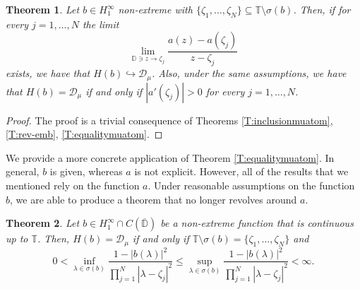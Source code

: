 \documentclass[12pt]{amsart}
\newtheorem{theorem}{Theorem}[section]
\theoremstyle{definition}
\theoremstyle{remark}
\theoremstyle{remark}
\begin{document}
\begin{theorem}
    Let $b\in H^\infty_1$ non-extreme with $\{\zeta_1,\ldots,\zeta_N\}\subseteq \mathbb{T}\setminus\sigma(b)$. Then, if for every $j=1,\ldots,N$ the limit
    \[\lim_{\mathbb{D}\ni z\to\zeta_j}\frac{a(z)-a(\zeta_j)}{z-\zeta_j}\]
    exists, we have that $H(b)\hookrightarrow\mathcal{D}_\mu$. Also, under the same assumptions, we have that  $H(b)=\mathcal{D}_\mu$ if and only if $|a'(\zeta_j)|>0$ for every $j=1,\ldots,N$.
\end{theorem}
\begin{proof}
    The proof is a trivial consequence of Theorems \ref{T:inclusionmuatom}, \ref{T:rev-emb}, \ref{T:equalitymuatom}.
\end{proof}
We provide a more concrete application of Theorem \ref{T:equalitymuatom}. In general, $b$ is given, whereas $a$ is not explicit. However, all of the results that we mentioned rely on the function $a$. Under reasonable assumptions on the function $b$, we are able to produce a theorem that no longer revolves around $a$.

\begin{theorem} \label{T:applicationbcontinuous}
    Let $b\in H^\infty_1\cap C(\overline{\mathbb{D}})$ be a non-extreme function that is continuous up to $\mathbb{T}$. Then, $H(b)=\mathcal{D}_\mu$ if and only if $\mathbb{T}\setminus\sigma(b)=\{\zeta_1,\ldots,\zeta_N\}$ and 
    \[0<\inf_{\lambda\in\sigma(b)}\frac{1-|b(\lambda)|^2}{\prod_{j=1}^N|\lambda-\zeta_j|^2}\leq \sup_{\lambda\in\sigma(b)}\frac{1-|b(\lambda)|^2}{\prod_{j=1}^N|\lambda-\zeta_j|^2} <\infty.\]
\end{theorem}
\end{document}
